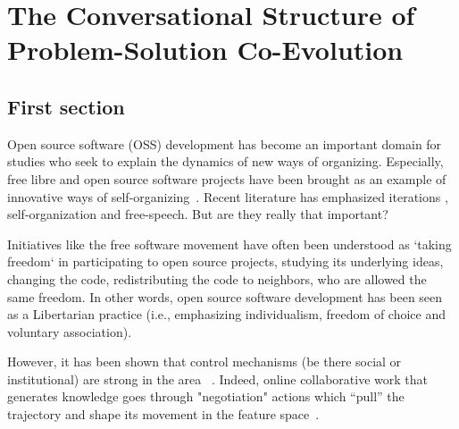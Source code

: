 \chapter{The Conversational Structure of Problem-Solution Co-Evolution}


\section{First section}

Open source software (OSS) development has become an important domain for studies who seek to explain the dynamics of new ways of organizing. Especially, free libre and open source software projects have been brought as an example of innovative ways of self-organizing~\cite{DBLP:journals/mansci/KroghH06,DBLP:journals/misq/HowisonC14}. Recent literature has emphasized iterations \cite{Berente2007}, self-organization and free-speech. But are they really that important?

Initiatives like the free software movement have often been understood as 
`taking freedom` in participating to open source projects, studying its underlying ideas, changing the code, redistributing the code to neighbors, who are allowed the same freedom. In other words, open source software development has been seen as a Libertarian practice (i.e., emphasizing individualism, freedom of choice and voluntary association). 



However, it has been shown that control mechanisms (be there social or institutional) are strong in the area ~\cite{Lindberg2016}. Indeed, online collaborative work that generates knowledge goes through "negotiation" actions which “pull” the trajectory and shape its movement in the feature space~\cite{Arazy2020}. 

